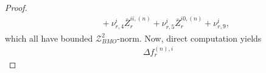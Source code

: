 \documentclass[10pt,a4paper]{amsart}
\begin{document}
\begin{proof}
\begin{align}
&\ \ \ \ + \nu_{r,4}^{i}\bar{Z}_{r}^{ii,(n)} + \nu_{r,5}^{i}\bar{Z}_{r}^{i0,(n)} + \nu_{r,9}^{i}, \nonumber
\end{align}
which all have bounded $\mathcal{Z}_{BMO}^{2}$-norm.
Now, direct computation yields
\begin{align}
\Delta f_{r}^{(n),i} 

\end{align}
\end{proof}
\end{document}

